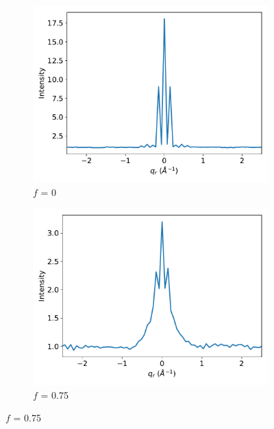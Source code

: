 \documentclass[journal=jpcbfk,manuscript=article]{achemso}
\begin{document}
  \begin{figure}
  \centering
  \begin{subfigure}{0.3\textwidth}
  \includegraphics[width=\textwidth]{sf_qy_sr0.pdf}
  \caption{$f$ = 0}\label{fig:sf_qy_sr0}
  \end{subfigure}
  \begin{subfigure}{0.3\textwidth}
  \includegraphics[width=\textwidth]{sf_qy_sr75.pdf}
  \caption{$f$ = 0.75}\label{fig:sf_qy_sr75}
  \end{subfigure}

\end{figure}
\end{document}
